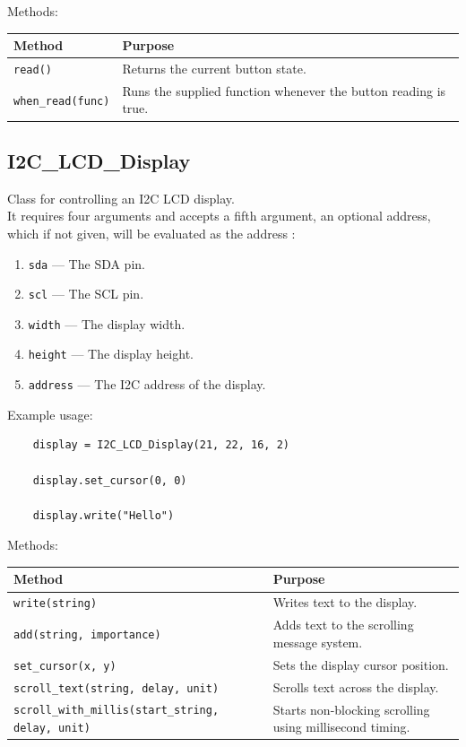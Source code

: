 Methods:

\begin{tabular}{ll}
	\toprule
	\textbf{Method} & \textbf{Purpose}\\
	\midrule
	\texttt{read()} & Returns the current button state.\\
	\texttt{when\_read(func)} & Runs the supplied function whenever the button reading is true.\\
	\bottomrule
\end{tabular}




\newpage

\subsection{I2C\_LCD\_Display}

Class for controlling an I2C LCD display.\\
It requires four arguments and accepts a fifth argument, an optional address, which if not given, will be evaluated as the address :

\begin{enumerate}
	\item \texttt{sda} --- The SDA pin.
	\item \texttt{scl} --- The SCL pin.
	\item \texttt{width} --- The display width.
	\item \texttt{height} --- The display height.
	\item \texttt{address} --- The I2C address of the display.
\end{enumerate}

Example usage:

\begin{lstlisting}
	display = I2C_LCD_Display(21, 22, 16, 2)
	
	display.set_cursor(0, 0)
	
	display.write("Hello")
\end{lstlisting}


Methods:

\begin{tabular}{ll}
	\toprule
	\textbf{Method} & \textbf{Purpose}\\
	\midrule
	\texttt{write(string)} & Writes text to the display.\\
	\texttt{add(string, importance)} & Adds text to the scrolling message system.\\
	\texttt{set\_cursor(x, y)} & Sets the display cursor position.\\
	\texttt{scroll\_text(string, delay, unit)} & Scrolls text across the display.\\
	\texttt{scroll\_with\_millis(start\_string, delay, unit)} & Starts non-blocking scrolling using millisecond timing.\\
	\bottomrule
\end{tabular}


